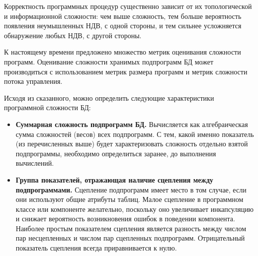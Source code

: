 \begin{enumerate}
    Корректность программных процедур существенно зависит от их топологической и информационной сложности:
    чем выше сложность, тем больше вероятность появления неумышленных НДВ, с одной стороны, и тем сильнее усложняется
    обнаружение любых НДВ, с другой стороны.

    К настоящему времени предложено множество метрик оценивания сложности программ. Оценивание сложности
    хранимых подпрограмм БД может производиться с использованием метрик размера программ и метрик сложности
    потока управления.

    Исходя из сказанного, можно определить следующие характеристики программной сложности БД:
    \begin{itemize}
        \item \textbf{Суммарная сложность подпрограмм БД.} Вычисляется как алгебраическая сумма сложностей
        (весов) всех подпрограмм. С тем, какой именно показатель (из перечисленных выше) будет характеризовать
        сложность отдельно взятой подпрограммы, необходимо определиться заранее, до выполнения вычислений.

        \item \textbf{Группа показателей, отражающая наличие сцепления между подпрограммами.} Сцепление подпрограмм
        имеет место в том случае, если они используют общие атрибуты таблиц. Малое сцепление в программном
        классе или компоненте желательно, поскольку оно увеличивает инкапсуляцию и снижает вероятность возникновения
        ошибок в поведении компонента. Наиболее простым показателем сцепления является разность между числом пар
        несцепленных и числом пар сцепленных подпрограмм. Отрицательный показатель сцепления всегда приравнивается
        к нулю.
    \end{itemize}
\end{enumerate}
